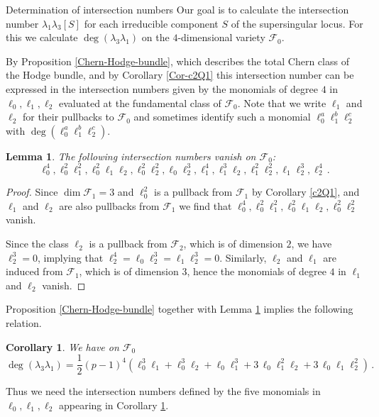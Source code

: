 \documentclass[11pt]{amsart}
\numberwithin{equation}{section}
\newtheorem{lemma}[theorem]{Lemma}
\newtheorem{corollary}[theorem]{Corollary}
\theoremstyle{definition}
\theoremstyle{remark}
\begin{document}
\begin{section}{Determination of intersection numbers}
Our goal is to calculate the intersection number 
$\lambda_1\lambda_3[S]$
for each irreducible component  
$S$ of the supersingular locus.
For this we calculate $\deg (\lambda_3\lambda_1)$ on the $4$-dimensional variety $\mathcal{F}_0$. 

By Proposition \ref{Chern-Hodge-bundle}, 
which describes the total Chern class of the Hodge bundle, and by Corollary \ref{Cor-c2Q1}
this intersection number can be expressed
in the intersection numbers given by the monomials of degree $4$ in $\ell_0,\ell_1,\ell_2$
evaluated at the fundamental class of $\mathcal{F}_0$. 
Note that we write $\ell_1$ and $\ell_2$ for their
pullbacks to $\mathcal{F}_0$ and sometimes identify such a monomial
$\ell_0^{a}\ell_1^b\ell_2^c$
with $\deg(\ell_0^{a}\ell_1^b\ell_2^c)$. 

\begin{lemma} \label{vanishing-monomials}
The following intersection numbers vanish on 
$\mathcal{F}_0$:
$$
\ell_0^4, \ell_0^2\ell_1^2, \ell_0^2\ell_1\ell_2, \ell_0^2\ell_2^2, \ell_0\ell_2^3,
\ell_1^4, \ell_1^3\ell_2, \ell_1^2\ell_2^2,
\ell_1\ell_2^3, \ell_2^4 \, .
$$ 
\end{lemma}
\begin{proof}
Since $\dim \mathcal{F}_1=3$ and $\ell_0^2$ is a pullback from $\mathcal{F}_1$ by Corollary \ref{c2Q1},
and $\ell_1$ and $\ell_2$ are also pullbacks from $\mathcal{F}_1$ we find
that $\ell_0^4, \ell_0^2\ell_1^2, \ell_0^2\ell_1\ell_2, \ell_0^2\ell_2^2$
vanish. 

Since the class $\ell_2$ is a pullback from $\mathcal{F}_2$, which is of dimension $2$,
we have $\ell_2^3=0$, implying that $\ell_2^4=\ell_0\ell_2^3=\ell_1\ell_2^3=0$.
Similarly, $\ell_2$ and $\ell_1$ are induced from $\mathcal{F}_1$, which is of dimension
$3$, hence the monomials of degree $4$ in $\ell_1$ and $\ell_2$ vanish.
\end{proof}


Proposition \ref{Chern-Hodge-bundle} together with Lemma \ref{vanishing-monomials}
implies the following relation.

\begin{corollary} \label{lambda3lambda1S}
We have on $\mathcal{F}_0$
$$
\deg(\lambda_3\lambda_1)= \frac{1}{2}(p-1)^4 
\left(\ell_0^3\ell_1+\ell_0^3\ell_2+ \ell_0\ell_1^3+ 3\, \ell_0\ell_1^2\ell_2 + 3\, \ell_0\ell_1\ell_2^2\right)\, .
$$ 
\end{corollary}
Thus we need the intersection numbers defined by the five monomials in $\ell_0, \ell_1, \ell_2$
appearing in Corollary \ref{lambda3lambda1S}.


\end{section}
\end{document}
